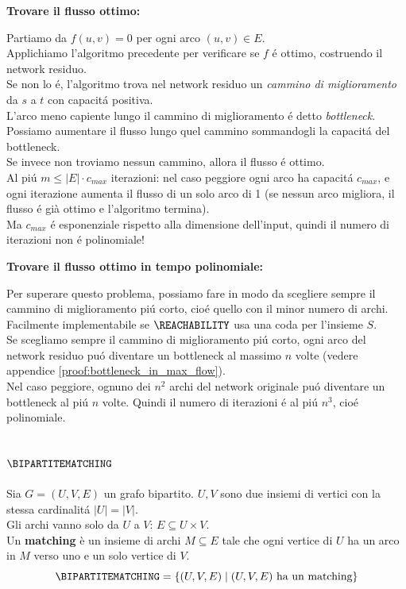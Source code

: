 \textbf{Trovare il flusso ottimo:}

Partiamo da $f(u,v) = 0$ per ogni arco $(u,v) \in E$. \\
Applichiamo l'algoritmo precedente per verificare se $f$ é ottimo, costruendo il network residuo. \\
Se non lo é, l'algoritmo trova nel network residuo
un \textit{cammino di miglioramento} da $s$ a $t$ con capacitá positiva. \\
L'arco meno capiente lungo il cammino di miglioramento é detto \textit{bottleneck}. \\
Possiamo aumentare il flusso lungo quel cammino sommandogli la capacitá del bottleneck. \\
Se invece non troviamo nessun cammino, allora il flusso é ottimo. \\
Al piú $m \leq |E| \cdot c_{max}$ iterazioni: nel caso peggiore ogni arco ha capacitá $c_{max}$,
e ogni iterazione aumenta il flusso di un solo arco di 1 
(se nessun arco migliora, il flusso é già ottimo e l'algoritmo termina). \\
Ma $c_{max}$ é esponenziale rispetto alla dimensione dell'input, 
quindi il numero di iterazioni non é polinomiale!

\textbf{Trovare il flusso ottimo in tempo polinomiale:}

Per superare questo problema, possiamo fare in modo da scegliere sempre il 
cammino di miglioramento piú corto, cioé quello con il minor numero di archi. \\
Facilmente implementabile se $\REACHABILITY$ usa una coda per l'insieme $S$. \\
Se scegliamo sempre il cammino di miglioramento piú corto, 
ogni arco del network residuo puó diventare un bottleneck al massimo $n$ volte (vedere appendice \ref{proof:bottleneck_in_max_flow}). \\

Nel caso peggiore, ognuno dei $n^2$ archi del network originale 
puó diventare un bottleneck al piú $n$ volte.
Quindi il numero di iterazioni é al piú $n^3$, cioé polinomiale.


\subsection{$\BIPARTITEMATCHING$}
Sia $G = (U, V, E)$ un grafo bipartito. $U, V$ sono due insiemi di vertici con la stessa cardinalitá $|U| = |V|$. \\ 
Gli archi vanno solo da $U$ a $V$: $E \subseteq U \times V$. \\
Un \textbf{matching} è un insieme di archi $M \subseteq E$ tale che ogni vertice di $U$ ha un arco in $M$ verso uno e un solo vertice di $V$.
\[
\BIPARTITEMATCHING = \{ (U, V, E) \mid (U, V, E) \text{ ha un matching} \}
\]

